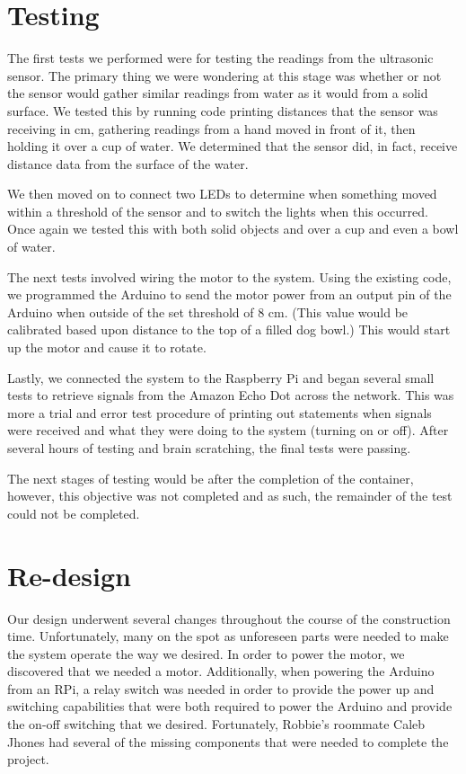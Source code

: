 \documentclass[notitlepage,11pt]{article}
\begin{document}
    \section{Testing}
        The first tests we performed were for testing the readings from the ultrasonic sensor. The primary thing we were
         wondering at this stage was whether or not the sensor would gather similar readings from water as it would from 
         a solid surface. We tested this by running code printing distances that the sensor was receiving in cm, gathering 
         readings from a hand moved in front of it, then holding it over a cup of water. We determined that the sensor did, 
         in fact, receive distance data from the surface of the water. 

        We then moved on to connect two LEDs to determine when something moved within a threshold of the sensor and to 
        switch the lights when this occurred. Once again we tested this with both solid objects and over a cup and even 
        a bowl of water.

        The next tests involved wiring the motor to the system. Using the existing code, we programmed the Arduino to 
        send the motor power from an output pin of the Arduino when outside of the set threshold of 8 cm. (This value 
        would be calibrated based upon distance to the top of a filled dog bowl.) This would start up the motor and cause 
        it to rotate.

        Lastly, we connected the system to the Raspberry Pi and began several small tests to retrieve signals from the 
        Amazon Echo Dot across the network. This was more a trial and error test procedure of printing out statements when 
        signals were received and what they were doing to the system (turning on or off). After several hours of testing 
        and brain scratching, the final tests were passing.

        The next stages of testing would be after the completion of the container, however, this objective was not 
        completed and as such, the remainder of the test could not be completed.
    
    \section{Re-design}
        Our design underwent several changes throughout the course of the construction time. Unfortunately, many on the 
        spot as unforeseen parts were needed to make the system operate the way we desired. In order to power the motor, 
        we discovered that we needed a motor. Additionally, when powering the Arduino from an RPi, a relay switch was 
        needed in order to provide the power up and switching capabilities that were both required to power the Arduino 
        and provide the on-off switching that we desired. Fortunately, Robbie's roommate Caleb Jhones had several of the
        missing components that were needed to complete the project.
\end{document}
